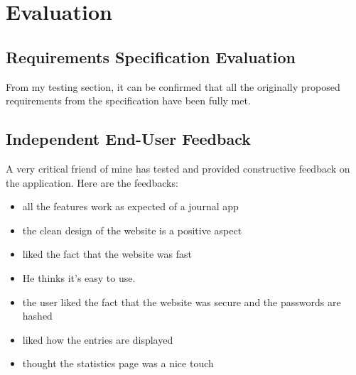 \chapter{Evaluation}

\section{Requirements Specification Evaluation}
From my testing section, it can be confirmed that all the originally proposed requirements from the specification have been fully met.

\section{Independent End-User Feedback}
A very critical friend of mine has tested and provided constructive feedback on the application. Here are the feedbacks:

\begin{itemize}
    \item all the features work as expected of a journal app
    \item the clean design of the website is a positive aspect
    \item liked the fact that the website was fast
    \item He thinks it's easy to use.
    \item the user liked the fact that the website was secure and the passwords are hashed
    \item liked how the entries are displayed
    \item thought the statistics page was a nice touch
\end{itemize}

